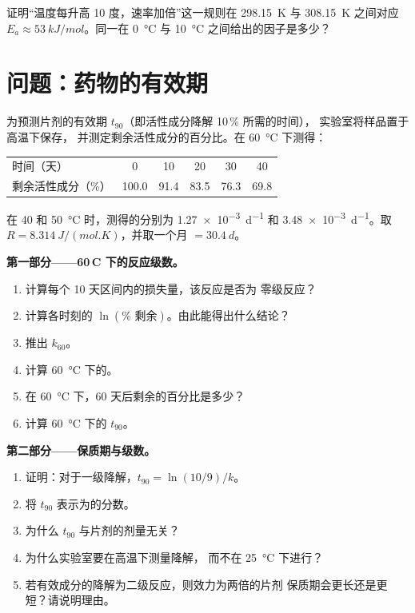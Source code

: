 \begin{exercise}[$\star\star\star$]\label{exo:b1:rate-laws:12}
证明“温度每升高 10 度，速率加倍”这一规则在
\qty{298.15}{K} 与 \qty{308.15}{K} 之间对应 $E_a \approx
\qty{53}{kJ/mol}$。同一在
\qty{0}{\celsius} 与 \qty{10}{\celsius} 之间给出的因子是多少？
\end{exercise}

\section{问题：药物的有效期}

\begin{problem}
\label{pb:b1:rate-laws:1}
为预测片剂的有效期 $t_{90}$（即活性成分降解 10\,\% 所需的时间），
实验室将样品置于高温下保存，
并测定剩余活性成分的百分比。在
\qty{60}{\celsius} 下测得：
\begin{center}
\begin{tabular}{lccccc}
\hline
时间（天） & 0 & 10 & 20 & 30 & 40 \\
剩余活性成分（\%） & 100.0 & 91.4 & 83.5 & 76.3 & 69.8 \\
\hline
\end{tabular}
\end{center}
在 40 和 \qty{50}{\celsius} 时，测得的分别为
\qty{1.27e-3}{d^{-1}} 和 \qty{3.48e-3}{d^{-1}}。取 $R =
\qty{8.314}{J/(mol.K)}$，并取一个月 $= \qty{30.4}{d}$。

\medskip
\noindent\textbf{第一部分——60\,\textdegree C 下的反应级数。}
\begin{enumerate}
  \item 计算每个 10 天区间内的损失量，该反应是否为
        零级反应？
  \item 计算各时刻的 $\ln(\%\text{ 剩余})$。由此能得出什么结论？
  \item 推出 $k_{60}$。
  \item 计算 \qty{60}{\celsius} 下的。
  \item 在 \qty{60}{\celsius} 下，60 天后剩余的百分比是多少？
  \item 计算 \qty{60}{\celsius} 下的 $t_{90}$。
\end{enumerate}

\medskip
\noindent\textbf{第二部分——保质期与级数。}
\begin{enumerate}[resume]
  \item 证明：对于一级降解，$t_{90} = \ln(10/9)/k$。
  \item 将 $t_{90}$ 表示为的分数。
  \item 为什么 $t_{90}$ 与片剂的剂量无关？
  \item 为什么实验室要在高温下测量降解，
        而不在 \qty{25}{\celsius} 下进行？
  \item 若有效成分的降解为二级反应，则效力为两倍的片剂
        保质期会更长还是更短？请说明理由。
\end{enumerate}


\end{problem}
